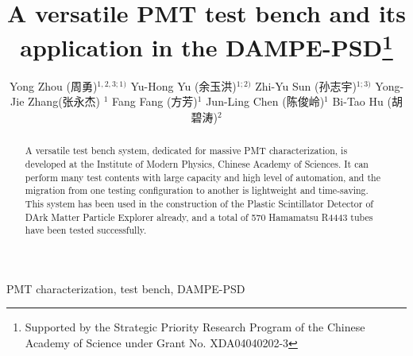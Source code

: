 \documentclass[a4paper,10pt,twoside]{cpc-hepnp}
\begin{document}
\begin{CJK*}{UTF8}{gbsn}






\title{A versatile PMT test bench and its application in the DAMPE-PSD\thanks{Supported by the Strategic Priority Research Program of the Chinese Academy of Science under Grant No. XDA04040202-3}}

\author{%
      Yong Zhou (周勇)$^{1,2,3;1)}$%
\quad Yu-Hong Yu (余玉洪)$^{1;2)}$%
\quad Zhi-Yu Sun (孙志宇)$^{1;3)}$
\quad Yong-Jie Zhang(张永杰) $^{1}$
\quad Fang Fang (方芳)$^{1}$
\quad Jun-Ling Chen (陈俊岭)$^{1}$
\quad Bi-Tao Hu (胡碧涛)$^{2}$
}
\maketitle


\address{%
$^1$ Institute of Modern Physics, Chinese Academy of Sciences,  509 Nanchang Road,  Lanzhou,  730000,  P.R.China\\
$^2$ School of Nuclear Science and Technology,  Lanzhou University,  222 South Tianshui Road,  Lanzhou,  730000,  P.R.China\\
$^3$ Graduate University of the Chinese Academy of Sciences,  19A Yuquan Road,  Beijing,  100049,  P.R.China\\
}


\begin{abstract}
A versatile test bench system, dedicated for massive PMT characterization, is developed at the Institute of Modern Physics, Chinese Academy of Sciences. 
It can perform many test contents with large capacity and high level of automation, and the migration from one testing configuration to another is lightweight and time-saving. 
This system has been used in the construction of the Plastic Scintillator Detector of DArk Matter Particle Explorer already, and a total of 570 Hamamatsu R4443 tubes have been tested successfully.
\end{abstract}


\begin{keyword}
PMT characterization, test bench, DAMPE-PSD
\end{keyword}


\end{CJK*}
\end{document}
